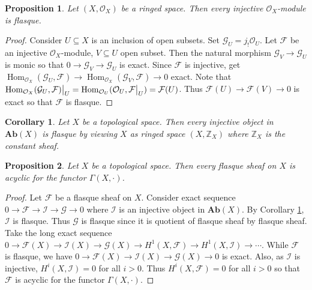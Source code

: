 \documentclass{ctexart}
\newtheorem{proposition}{Proposition}[section]
\newtheorem{corollary}{Corollary}[section]
\renewcommand{\hom}{\operatorname{Hom}}
\newcommand{\abeliangroups}{\mathbf{Ab}}
\begin{document}
\begin{proposition}
    Let $(X, \mathcal{O}_{X})$ be a ringed space.
    Then every injective $\mathcal{O}_{X}$-module is flasque.
    \vspace{-\baselineskip} %
    \label{Proposition 2.4}
\end{proposition}
\begin{proof}
    Consider $U \subseteq X$ is an inclusion of open subsets.
    Set $\mathcal{G}_{U} = j_{!}\mathcal{O}_{U}$.
    Let $\mathcal{F}$ be an injective $\mathcal{O}_{X}$-module, $V \subseteq U$ open subset.
    Then the natural morphism $\mathcal{G}_{V} \longrightarrow \mathcal{G}_{U}$ is monic so that $0 \longrightarrow \mathcal{G}_{V} \longrightarrow \mathcal{G}_{U}$ is exact.
    Since $\mathcal{F}$ is injective, get $\hom_{\mathcal{O}_{X}}(\mathcal{G}_{U}, \mathcal{F}) \longrightarrow \hom_{\mathcal{O}_{X}}(\mathcal{G}_{V}, \mathcal{F}) \longrightarrow 0$ exact.
    Note that $\hom_{\mathcal{O}_{X}}(\mathcal{G}_{U}, \mathcal{F})\big{|}_{U} = \hom_{\mathcal{O}_{U}}(\mathcal{O}_{U}, \mathcal{F}\big{|}_{U}) = \mathcal{F}(U)$.
    Thus $\mathcal{F}(U) \longrightarrow \mathcal{F}(V) \longrightarrow 0$ is exact so that $\mathcal{F}$ is flasque.
\end{proof}
\begin{corollary}
    Let $X$ be a topological space.
    Then every injective object in $\abeliangroups (X)$ is flasque by viewing $X$ as ringed space $(X, \mathbb{Z}_{X})$ where $\mathbb{Z}_{X}$ is the constant sheaf.
    \label{Corollary 2.1}
\end{corollary}
\begin{proposition}
    Let $X$ be a topological space.
    Then every flasque sheaf on $X$ is acyclic for the functor $\Gamma(X, \cdot)$.
    \label{Proposition 2.5}
\end{proposition}
\begin{proof}
    Let $\mathcal{F}$ be a flasque sheaf on $X$.
    Consider exact sequence $0 \longrightarrow \mathcal{F} \longrightarrow \mathcal{I} \longrightarrow \mathcal{G} \longrightarrow 0$ where $\mathcal{I}$ is an injective object in $\abeliangroups (X)$.
    By Corollary \ref{Corollary 2.1}, $\mathcal{I}$ is flasque.
    Thus $\mathcal{G}$ is flasque since it is quotient of flasque sheaf by flasque sheaf.
    Take the long exact sequence $0 \longrightarrow \mathcal{F}(X) \longrightarrow \mathcal{I}(X) \longrightarrow \mathcal{G}(X) \longrightarrow H^{1}(X, \mathcal{F}) \longrightarrow H^{1}(X, \mathcal{I}) \longrightarrow \cdots$.
    While $\mathcal{F}$ is flasque, we have $0 \longrightarrow \mathcal{F}(X) \longrightarrow \mathcal{I}(X) \longrightarrow \mathcal{G}(X) \longrightarrow 0$ is exact.
    Also, as $\mathcal{I}$ is injective, $H^{i}(X, \mathcal{I}) = 0$ for all $i > 0$.
    Thus $H^{i}(X, \mathcal{F}) = 0$ for all $i > 0$ so that $\mathcal{F}$ is acyclic for the functor $\Gamma(X, \cdot)$. 
\end{proof}
\end{document}
